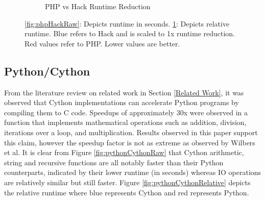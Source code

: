 \begin{figure}[H]
\begin{subfigure}{.5\textwidth}
  \caption{PHP vs Hack Runtime Reduction}
  \label{fig:phpHackRelative}
\end{subfigure}
\caption{\ref{fig:phpHackRaw}: Depicts runtime in seconds. \ref{fig:phpHackRelative}: Depicts relative runtime. Blue refers to Hack and is scaled to 1x runtime reduction. Red values refer to PHP. Lower values are better.}
\label{fig:phpHack}
\end{figure}


\subsection{Python/Cython}
From the literature review on related work in Section \ref{Related Work}, it was observed that Cython implementations can accelerate Python programs by compiling them to C code. Speedups of approximately 30x were observed in a function that implements mathematical operations such as addition, division, iterations over a loop, and multiplication. Results observed in this paper support this claim, however the speedup factor is not as extreme as observed by Wilbers et al. It is clear from Figure \ref{fig:pythonCythonRaw} that Cython arithmetic, string and recursive functions are all notably faster than their Python counterparts, indicated by their lower runtime (in seconds) whereas IO operations are relatively similar but still faster. Figure \ref{fig:pythonCythonRelative} depicts the relative runtime where blue represents Cython and red represents Python. 

